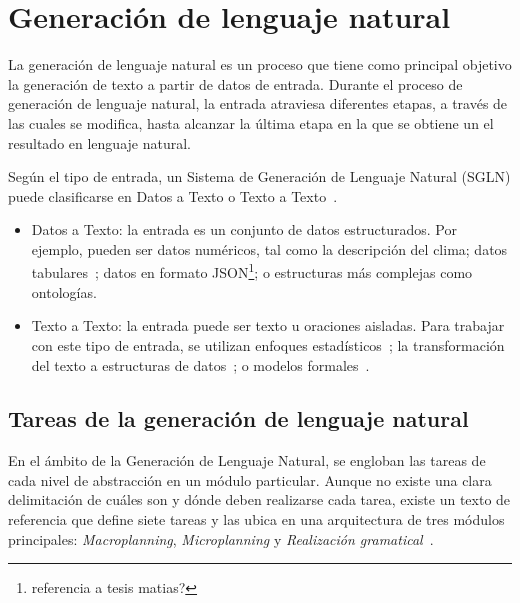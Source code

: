 \section{Generación de lenguaje natural}
\label{sec:tareas_gnl}
La generación de lenguaje natural es un proceso que tiene como principal objetivo la generación de texto a partir de datos de entrada.
Durante el proceso de generación de lenguaje natural, la entrada atraviesa diferentes etapas, a través de las cuales se modifica, hasta alcanzar la última etapa en la que se obtiene un el resultado en lenguaje natural.

Según el tipo de entrada, un Sistema de Generación de Lenguaje Natural (SGLN) puede clasificarse en Datos a Texto o Texto a Texto~\cite{vicente2015generacion}.
\begin{itemize}
    \item Datos a Texto: la entrada es un conjunto de datos estructurados. Por ejemplo, pueden ser datos numéricos, tal como la descripción del clima; datos  tabulares~\cite{mahapatra2016statistical}; datos en formato JSON\footnote{referencia a tesis matias?}; o estructuras más complejas como ontologías.
    \item Texto a Texto: la entrada puede ser texto u oraciones aisladas. Para trabajar con este tipo de entrada, se utilizan enfoques estadísticos~\cite{mittal1999ultra}; la transformación del texto a estructuras de datos~\cite{saldanha2004creation}; o modelos formales~\cite{guo2018long}.
\end{itemize}

\subsection{Tareas de la generación de lenguaje natural}
En el ámbito de la Generación de Lenguaje Natural, se engloban las tareas de cada nivel de abstracción en un módulo particular. Aunque no existe una clara delimitación de cuáles son y dónde deben realizarse cada tarea, existe un texto de referencia que define siete tareas y las ubica en una arquitectura de tres módulos principales: \emph{Macroplanning}, \emph{Microplanning} y \emph{Realización gramatical}~\cite{vicente2015generacion}.

